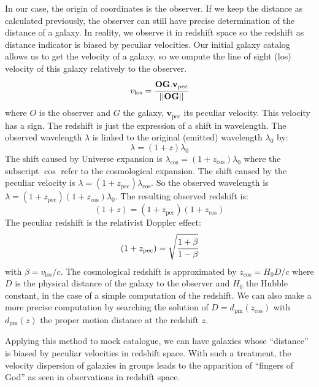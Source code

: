 In our case, the origin of coordinates is the observer. If we keep the distance
as calculated previously, the observer can still have precise determination of
the distance of a galaxy. In reality, we observe it in redshift space so the
redshift as distance indicator is biased by peculiar velocities. Our initial
galaxy catalog allows us to get the velocity of a galaxy, so we ompute the line
of sight (los) velocity of this galaxy relatively to the observer.
%
\begin{equation}
v_\mathrm{los}=\cfrac{\textbf{OG}.\textbf{v}_\mathrm{pec}}
    {\left|\left|\textbf{OG}\right|\right|}
\end{equation}
%
where $O$ is the observer and $G$ the galaxy, $\textbf{v}_{\mathrm{pec}}$ its
peculiar velocity. This velocity has a sign. The redshift is just the
expression of a shift in wavelength. The observed wavelength $\lambda$ is
linked to the original (emitted) wavelength $\lambda_0$ by:
%
\begin{equation}
    \lambda=(1+z)\lambda_0
\end{equation}
%
The shift caused by Universe expansion is
$\lambda_{\cos}=(1+z_{\cos})\lambda_0$ where the subscript $\cos$ refer to the
cosmological expansion. The shift caused by the peculiar velocity is
$\lambda=(1+z_{\mathrm{pec}})\lambda_{\cos}$. So the observed wavelength is
$\lambda=(1+z_{\mathrm{pec}})(1+z_{\cos})\lambda_0$. The resulting observed
redshift is:
%
\begin{equation}
    (1+z)=(1+z_{\mathrm{pec}})(1+z_{\cos})
\end{equation}
%
The peculiar redshift is the relativist Doppler effect:
%
\begin{equation}
    (1+z_{\mathrm{pec}})=\sqrt{\cfrac{1+\beta}{1-\beta}}
\end{equation}
%
with $\beta={v_{\mathrm{los}}}/{c}$. The cosmological redshift is approximated
by $z_{\cos}={H_0}{D}/c$ where $D$ is the physical distance of the galaxy to
the observer and $H_0$ the Hubble constant, in the case of a simple computation
of the redshift. We can also make a more precise computation by searching the
solution of $D=d_\mathrm{pm} \left(z_{\cos}\right)$ with $d_\mathrm{pm}
\left(z\right)$ the proper motion distance at the redshift $z$.
%

Applying this method to mock catalogue, we can have galaxies whose ``distance''
is biased by peculiar velocities in redshift space. With such a treatment, the
velocity dispersion of galaxies in groups leads to the apparition of ``fingers
of God'' as seen in observations in redshift space.

